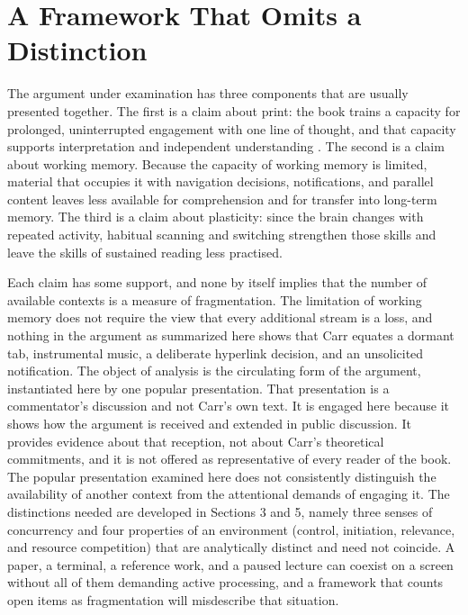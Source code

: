 \documentclass[12pt]{article}
\begin{document}
\section{A Framework That Omits a Distinction}

The argument under examination has three components that are usually presented together. The first is a claim about print: the book trains a capacity for prolonged, uninterrupted engagement with one line of thought, and that capacity supports interpretation and independent understanding \cite{carr2010shallows}. The second is a claim about working memory. Because the capacity of working memory is limited, material that occupies it with navigation decisions, notifications, and parallel content leaves less available for comprehension and for transfer into long-term memory. The third is a claim about plasticity: since the brain changes with repeated activity, habitual scanning and switching strengthen those skills and leave the skills of sustained reading less practised.

Each claim has some support, and none by itself implies that the number of available contexts is a measure of fragmentation. The limitation of working memory does not require the view that every additional stream is a loss, and nothing in the argument as summarized here shows that Carr equates a dormant tab, instrumental music, a deliberate hyperlink decision, and an unsolicited notification. The object of analysis is the circulating form of the argument, instantiated here by one popular presentation. That presentation is a commentator's discussion and not Carr's own text. It is engaged here because it shows how the argument is received and extended in public discussion. It provides evidence about that reception, not about Carr's theoretical commitments, and it is not offered as representative of every reader of the book. The popular presentation examined here does not consistently distinguish the availability of another context from the attentional demands of engaging it. The distinctions needed are developed in Sections 3 and 5, namely three senses of concurrency and four properties of an environment (control, initiation, relevance, and resource competition) that are analytically distinct and need not coincide. A paper, a terminal, a reference work, and a paused lecture can coexist on a screen without all of them demanding active processing, and a framework that counts open items as fragmentation will misdescribe that situation.
\end{document}
